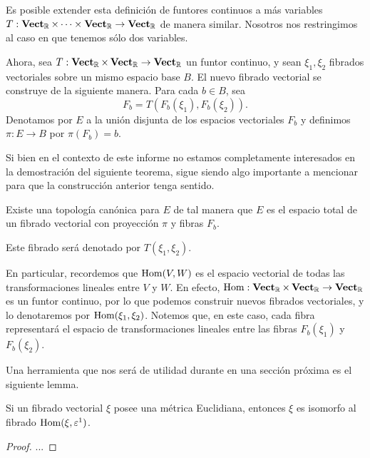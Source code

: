 Es posible extender esta definición de funtores continuos a más variables $T : \operatorname{\mathbf{Vect}}_{\mathbb{R}} \times \cdots \times \operatorname{\mathbf{Vect}}_{\mathbb{R}} \to \operatorname{\mathbf{Vect}}_{\mathbb{R}}$ de manera similar. Nosotros nos restringimos al caso en que tenemos sólo dos variables. \par
Ahora, sea $T : \operatorname{\mathbf{Vect}}_{\mathbb{R}} \times \operatorname{\mathbf{Vect}}_{\mathbb{R}} \to \operatorname{\mathbf{Vect}}_{\mathbb{R}}$ un funtor continuo, y sean $\xi_{1},\xi_{2}$ fibrados vectoriales sobre un mismo espacio base $B$. El nuevo fibrado vectorial se construye de la siguiente manera. Para cada $b \in B$, sea
\[ F_{b} = T(F_{b}(\xi_{1}), F_{b}(\xi_{2})). \]
Denotamos por $E$ a la unión disjunta de los espacios vectoriales $F_{b}$ y definimos $\pi \colon E \to B$ por $\pi(F_{b}) = b$. \par

Si bien en el contexto de este informe no estamos completamente interesados en la demostración del siguiente teorema, sigue siendo algo importante a mencionar para que la construcción anterior tenga sentido.

\begin{theorem}
	Existe una topología canónica para $E$ de tal manera que $E$ es el espacio total de un fibrado vectorial con proyección $\pi$ y fibras $F_{b}$.
\end{theorem}

\begin{definition}
	Este fibrado será denotado por $T(\xi_{1},\xi_{2})$.
\end{definition}

En particular, recordemos que $\operatorname{Hom}(V,W)$ es el espacio vectorial de todas las transformaciones lineales entre $V$ y $W$. En efecto, $\operatorname{Hom} : \operatorname{\mathbf{Vect}}_{\mathbb{R}} \times \operatorname{\mathbf{Vect}}_{\mathbb{R}} \to \operatorname{\mathbf{Vect}}_{\mathbb{R}}$ es un funtor continuo, por lo que podemos construir nuevos fibrados vectoriales, y lo denotaremos por $\operatorname{Hom}(\xi_{1},\xi_{2})$. Notemos que, en este caso, cada fibra representará el espacio de transformaciones lineales entre las fibras $F_{b}(\xi_{1})$ y $F_{b}(\xi_{2})$. \par

Una herramienta que nos será de utilidad durante en una sección próxima es el siguiente lemma.

\begin{lemma}
	Si un fibrado vectorial $\xi$ posee una métrica Euclidiana, entonces $\xi$ es isomorfo al fibrado $\operatorname{Hom}(\xi, \varepsilon^{1})$.
\end{lemma}
\begin{proof}
	...
\end{proof}
